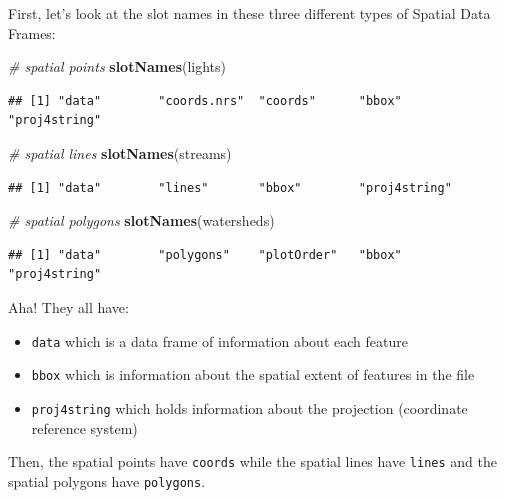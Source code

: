 \documentclass[]{book}
\newenvironment{Shaded}{\begin{snugshade}}{\end{snugshade}}
\newcommand{\KeywordTok}[1]{\textcolor[rgb]{0.13,0.29,0.53}{\textbf{{#1}}}}
\newcommand{\CommentTok}[1]{\textcolor[rgb]{0.56,0.35,0.01}{\textit{{#1}}}}
\newcommand{\NormalTok}[1]{{#1}}
\providecommand{\tightlist}{%
  \setlength{\itemsep}{0pt}\setlength{\parskip}{0pt}}
\theoremstyle{definition}
\theoremstyle{definition}
\theoremstyle{remark}
\begin{document}
First, let's look at the slot names in these three different types of
Spatial Data Frames:

\begin{Shaded}
\begin{Highlighting}[]
\CommentTok{# spatial points}
\KeywordTok{slotNames}\NormalTok{(lights)}
\end{Highlighting}
\end{Shaded}

\begin{verbatim}
## [1] "data"        "coords.nrs"  "coords"      "bbox"        "proj4string"
\end{verbatim}

\begin{Shaded}
\begin{Highlighting}[]
\CommentTok{# spatial lines}
\KeywordTok{slotNames}\NormalTok{(streams)}
\end{Highlighting}
\end{Shaded}

\begin{verbatim}
## [1] "data"        "lines"       "bbox"        "proj4string"
\end{verbatim}

\begin{Shaded}
\begin{Highlighting}[]
\CommentTok{# spatial polygons}
\KeywordTok{slotNames}\NormalTok{(watersheds)}
\end{Highlighting}
\end{Shaded}

\begin{verbatim}
## [1] "data"        "polygons"    "plotOrder"   "bbox"        "proj4string"
\end{verbatim}

Aha! They all have:

\begin{itemize}
\tightlist
\item
  \texttt{data} which is a data frame of information about each feature
\item
  \texttt{bbox} which is information about the spatial extent of
  features in the file
\item
  \texttt{proj4string} which holds information about the projection
  (coordinate reference system)
\end{itemize}

Then, the spatial points have \texttt{coords} while the spatial lines
have \texttt{lines} and the spatial polygons have \texttt{polygons}.
\end{document}
